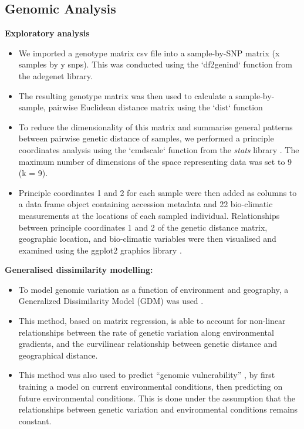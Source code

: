 \subsection{Genomic Analysis}
\textbf{Exploratory analysis}
\begin{itemize}
\item We imported a genotype matrix csv file into a sample-by-SNP matrix (x samples by y snps). This was conducted using the `df2genind` function from the adegenet library\cite{Jombart2011}.
\item The resulting genotype matrix was then used to calculate a sample-by-sample, pairwise Euclidean distance matrix using the `dist` function \cite{TeamRDevelopmentCore2011}
\item To reduce the dimensionality of this matrix and summarise general patterns between pairwise genetic distance of samples, we performed a principle coordinates analysis using the `cmdscale` function from the \textit{stats} library \cite{TeamRDevelopmentCore2011}. The maximum number of dimensions of the space representing data was set to 9 (k = 9).
\item Principle coordinates 1 and 2 for each sample were then added as columns to a data frame object containing accession metadata and 22 bio-climatic measurements at the locations of each sampled individual. Relationships between principle coordinates 1 and 2 of the genetic distance matrix, geographic location, and bio-climatic variables were then visualised and examined using the ggplot2 graphics library \cite{Wickham2016}.
\end{itemize}

\textbf{Generalised dissimilarity modelling:}
\begin{itemize}
\item To model genomic variation as a function of environment and geography, a Generalized Dissimilarity Model (GDM) was used \cite{Ferrier2007,Fitzpatrick2015}.
\item This method, based on matrix regression, is able to account for non-linear relationships between the rate of genetic variation along environmental gradients, and the curvilinear relationship between genetic distance and geographical distance.
\item This method was also used to predict ``genomic vulnerability'' \cite{Bay2018}, by first training a model on current environmental conditions, then predicting on future environmental conditions. This is done under the assumption that the relationships between genetic variation and environmental conditions remains constant.
\end{itemize}


